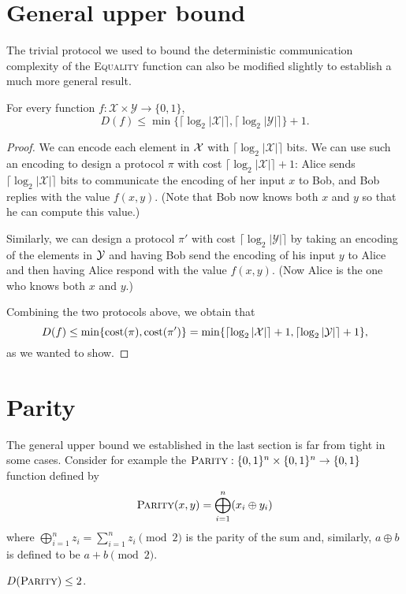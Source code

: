 \section{General upper bound}
The trivial protocol we used to bound the deterministic communication complexity of the \textsc{Equality} function can also be modified slightly to establish a much more general result.

\begin{theorem}
	For every function $f : \mathcal{X} \times \mathcal{Y} \to \{0,1\}$, 
	\[
	D(f) \le \min\{\lceil \log_2 |\mathcal{X}| \rceil, \lceil \log_2 |\mathcal{Y}| \rceil\} + 1.
	\]
\end{theorem}

\begin{proof}
	We can encode each element in $\mathcal{X}$ with $\lceil \log_2 |\mathcal{X}| \rceil$ bits. We can use such an encoding to design a protocol $\pi$ with cost $\lceil \log_2 |\mathcal{X}| \rceil + 1$: Alice sends $\lceil \log_2 |\mathcal{X}| \rceil$ bits to communicate the encoding of her input $x$ to Bob, and Bob replies with the value $f(x,y)$. (Note that Bob now knows both $x$ and $y$ so that he can compute this value.)
	
	Similarly, we can design a protocol $\pi'$ with cost $\lceil \log_2 |\mathcal{Y}| \rceil$ by taking an encoding of the elements in $\mathcal{Y}$ and having Bob send the encoding of his input $y$ to Alice and then having Alice respond with the value $f(x,y)$. (Now Alice is the one who knows both $x$ and $y$.)
	
	Combining the two protocols above, we obtain that
	\[
	D(f) \le \min\{ \mathrm{cost}(\pi), \mathrm{cost}(\pi') \} = \min\{\lceil \log_2 |\mathcal{X}| \rceil + 1, \lceil \log_2 |\mathcal{Y}| \rceil + 1\},
	\]
	as we wanted to show.
\end{proof}


\section{Parity}
The general upper bound we established in the last section is far from tight in some cases. Consider for example the $\textsc{Parity} : \{0,1\}^n \times \{0,1\}^n \to \{0,1\}$ function defined by
\[
\textsc{Parity}(x,y) = \bigoplus_{i=1}^n (x_i \oplus y_i) 
\]
where $\bigoplus_{i=1}^n z_i = \sum_{i=1}^n z_i \pmod{2}$ is the parity of the sum and, similarly, $a \oplus b$ is defined to be $a+b \pmod{2}$.

\begin{theorem}
	$D(\textsc{Parity}) \le 2$.
\end{theorem}

